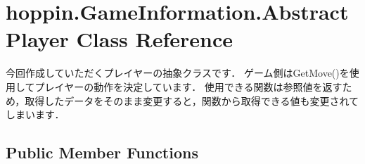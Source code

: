 \hypertarget{classhoppin_1_1_game_information_1_1_abstract_player}{}\section{hoppin.\+Game\+Information.\+Abstract\+Player Class Reference}
\label{classhoppin_1_1_game_information_1_1_abstract_player}


今回作成していただくプレイヤーの抽象クラスです． ゲーム側は\+Get\+Move()を使用してプレイヤーの動作を決定しています． 使用できる関数は参照値を返すため，取得したデータをそのまま変更すると，関数から取得できる値も変更されてしまいます．  


\subsection*{Public Member Functions}
